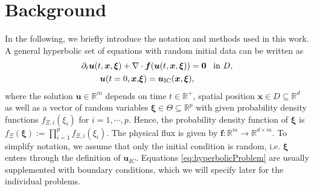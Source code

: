 \section{Background}
\label{sec:background}
In the following, we briefly introduce the notation and methods used in this work. A general hyperbolic set of equations with random initial data can be written as
\begin{subequations}\label{eq:hyperbolicProblem}
\begin{align}
\label{eq:fulleq}\partial_t \bm{u}(t,\bm{x},\bm{\xi}) + \nabla&\cdot\bm{f}(\bm{u}(t,\bm{x},\bm{\xi})) = \bm{0} \enskip \text{ in } D, \\ \label{eq:ic}
\bm{u}(t=0,\bm{x},&\bm{\xi}) = \bm{u}_{\text{IC}}(\bm{x},\bm{\xi}),
\end{align}
\end{subequations}
where the solution $\bm u\in\mathbb{R}^m$ depends on time $t\in\mathbb{R}^+$, spatial position $\bm{x}\in D\subseteq \mathbb{R}^d$ as well as a vector of random variables $\bm{\xi}\in\Theta\subseteq\mathbb{R}^p$ with given probability density functions $f_{\Xi,i}(\xi_i)$ for $i = 1,\cdots,p$. Hence, the probability density function of $\bm{\xi}$ is $f_{\Xi}(\bm\xi):=\prod_{i=1}^p f_{\Xi,i}(\xi_i)$. The physical flux is given by $\bm{f}:\mathbb{R}^m\to\mathbb{R}^{d\times m}$. To simplify notation, we assume that only the initial condition is random, i.e. $\bm{\xi}$ enters through the definition of $\bm{u}_{IC}$. Equations \eqref{eq:hyperbolicProblem} are usually supplemented with boundary conditions, which we will specify later for the individual problems.

